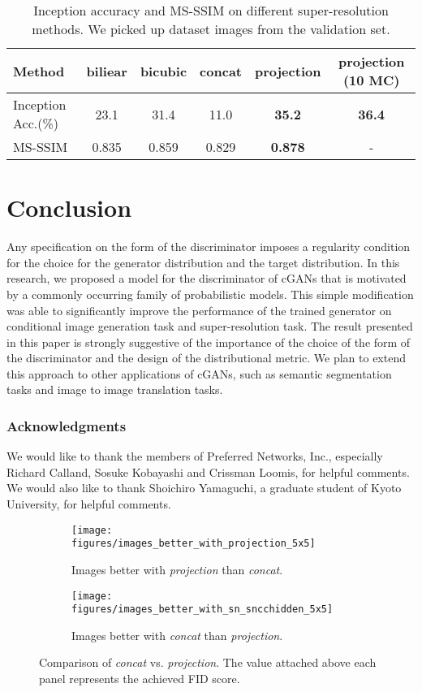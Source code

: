 \documentclass{article}
\begin{document}
\begin{table}[t]
    \centering
    \caption{\label{tab:scores_imagenet_sr}            
    Inception accuracy and MS-SSIM on different super-resolution
 methods. 
    We picked up dataset images from the validation set.} 
    \begin{tabular}[t]{lccccc}
        \toprule
        Method & biliear & bicubic & concat & projection & projection (10 MC) \\
        \midrule
        Inception Acc.(\%) & 23.1 & 31.4 & 11.0 & \textbf{35.2} & \bf{36.4} \\
        MS-SSIM & 0.835& 0.859 & 0.829 & \textbf{0.878} & - \\
        \bottomrule
    \end{tabular}
\end{table}
\section{Conclusion}
Any specification on the form of the discriminator imposes a regularity condition for the choice for the generator distribution and the target distribution. 
In this research, we proposed a model for the discriminator of cGANs that is motivated by a commonly occurring family of probabilistic models. 
This simple modification was able to significantly improve the performance of the trained generator on conditional image generation task and super-resolution task.
The result presented in this paper is strongly suggestive of the importance of the choice of the form of the discriminator and the design of the distributional metric. 
We plan to extend this approach to other applications of cGANs, such as semantic segmentation tasks and image to image translation tasks.

\subsubsection*{Acknowledgments}
We would like to thank the members of Preferred Networks, Inc., especially Richard Calland, Sosuke Kobayashi and Crissman Loomis, for helpful comments.
We would also like to thank Shoichiro Yamaguchi, a graduate student of Kyoto University, for helpful comments.

\begin{figure}[t]
	\centering
	\begin{subfigure}{0.48\textwidth}
    	\texttt{[image: figures/images\_better\_with\_projection\_5x5]}
        \caption{\label{subfig:comparison_projection} Images better with \textit{projection} than \textit{concat}.}
    \end{subfigure}\hfill \begin{subfigure}{0.48\textwidth}
    	\texttt{[image: figures/images\_better\_with\_sn\_sncchidden\_5x5]}
        \caption{\label{subfig:comparison_concat}Images better with \textit{concat} than \textit{projection}.}
    \end{subfigure}
    \caption{\label{fig:comparison_multipy_concat} Comparison of \textit{concat} vs. \textit{projection}.  
    The value attached above each panel represents the achieved FID score.}
\end{figure}
\end{document}
